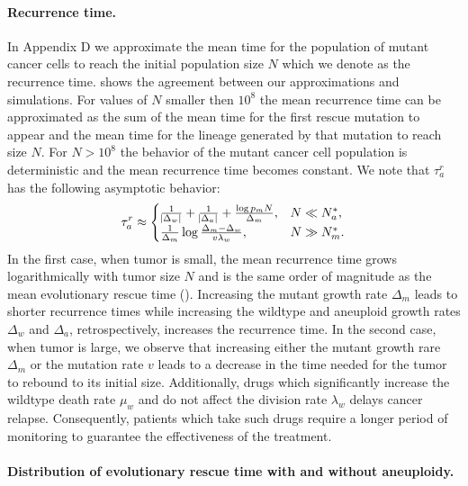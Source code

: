 \documentclass[12pt]{extarticle}
\begin{document}
\paragraph{Recurrence time.}

In Appendix D we approximate the mean time for the population of mutant cancer cells to reach the initial population size $N$ which we denote as the recurrence time.  shows the agreement between our approximations and simulations. For values of $N$ smaller then $10^8$ the mean recurrence time can be approximated as the sum of the mean time for the first rescue mutation to appear and the mean time for the lineage generated by that mutation to reach size $N$. For $N>10^8$ the behavior of the mutant cancer cell population is deterministic and the mean recurrence time becomes constant. We note that $\tau_a^r$ has the following asymptotic behavior:
\begin{equation} \label{eq:AsymptoticTimeRulesRecurrence}
\tau_a^r \approx \begin{cases}
   \frac{1}{ \abs{\Delta_w}}+\frac{1}{ \abs{\Delta_a}}+\frac{\log p_mN}{\Delta_m} ,&
 N \ll N_a^* ,\\ 
  \frac{1}{\Delta_m}\log\frac{\Delta_m-\Delta_w}{v\lambda_w}  ,&
  N \gg N_m^* .
  \end{cases}
\end{equation}
In the first case, when tumor is small, the mean recurrence time grows logarithmically with tumor size $N$ and is the same order of magnitude as the mean evolutionary rescue time (). Increasing the mutant growth rate $\Delta_m$ leads to shorter recurrence times while increasing the wildtype and aneuploid growth rates $\Delta_w$ and $\Delta_a$, retrospectively, increases the recurrence time. In the second case, when tumor is large, we observe that increasing either the mutant growth rare $\Delta_m$ or the mutation rate $v$ leads to a decrease in the time needed for the tumor to rebound to its initial size. Additionally, drugs which significantly increase the wildtype death rate $\mu_w$ and do not affect the division rate $\lambda_w$ delays cancer relapse. Consequently, patients which take such drugs require a longer period of monitoring to guarantee the effectiveness of the treatment.
\paragraph{Distribution of evolutionary rescue time with and without aneuploidy.}
\end{document}
